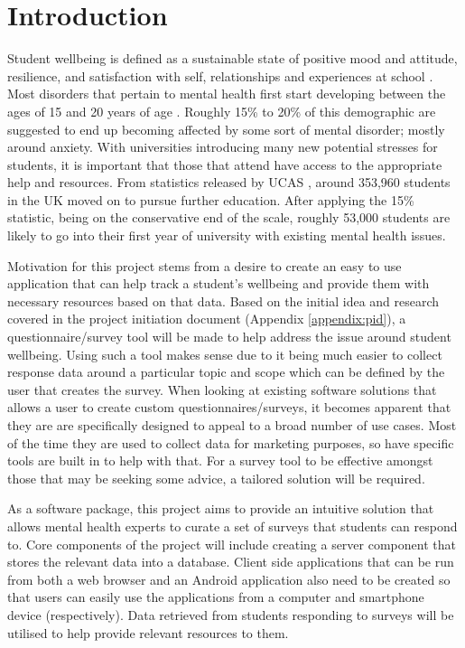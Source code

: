 \section{Introduction}

Student wellbeing is defined as a sustainable state of positive mood and attitude, resilience, and satisfaction with self, relationships and experiences
at school \cite{noble2008scoping}.
Most disorders that pertain to mental health first start developing between the ages of 15 and 20 years of age \cite{kessler2005lifetime}.
Roughly 15\% to 20\% of this demographic \cite{kessler2005lifetime} are suggested to end up becoming affected by some sort of mental disorder; mostly 
around anxiety.
With universities introducing many new potential stresses for students, it is important that those that attend have access to the appropriate help
and resources.
From statistics released by UCAS \cite{ucas_2018}, around 353,960 students in the UK moved on to pursue further education.
After applying the 15\% statistic, being on the conservative end of the scale, roughly 53,000 students are likely to go into their first year of
university with existing mental health issues.

Motivation for this project stems from a desire to create an easy to use application that can help track a student's wellbeing and provide them 
with necessary resources based on that data.
Based on the initial idea and research covered in the project initiation document (Appendix \ref{appendix:pid}), a questionnaire/survey tool will 
be made to help address the issue around student wellbeing.
Using such a tool makes sense due to it being much easier to collect response data around a particular topic and scope which can be defined by the user
that creates the survey.
When looking at existing software solutions that allows a user to create custom questionnaires/surveys, it becomes apparent that they are are specifically 
designed to appeal to a broad number of use cases.
Most of the time they are used to collect data for marketing purposes, so have specific tools are built in to help with that.
For a survey tool to be effective amongst those that may be seeking some advice, a tailored solution will be required.

As a software package, this project aims to provide an intuitive solution that allows mental health experts to curate a set of surveys that students
can respond to.
Core components of the project will include creating a server component that stores the relevant data into a database.
Client side applications that can be run from both a web browser and an Android application also need to be created so that users can easily use the 
applications from a computer and smartphone device (respectively).
Data retrieved from students responding to surveys will be utilised to help provide relevant resources to them.

